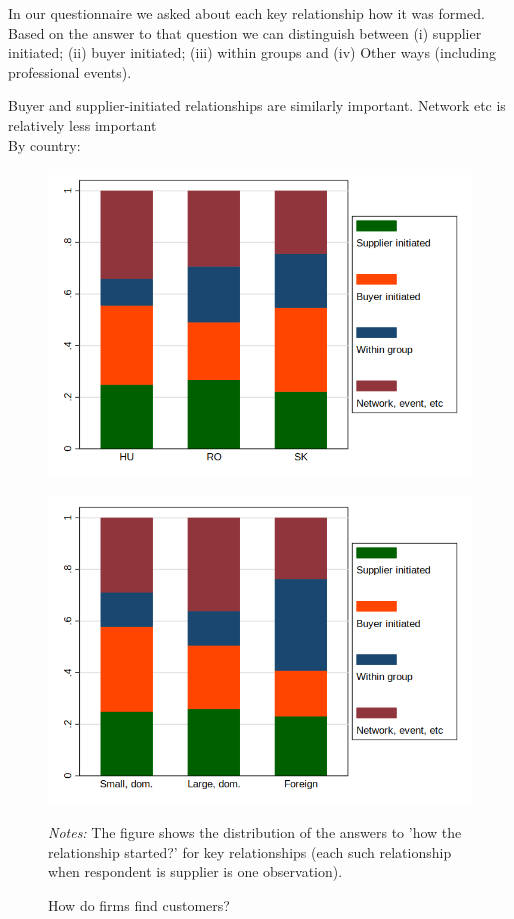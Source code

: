 \documentclass[final, dvipsnames, authoryear,12pt]{elsarticle}
\begin{document}
In our questionnaire we asked about each key relationship how it was formed. Based on the answer to that question we can distinguish between (i) supplier initiated; (ii) buyer initiated; (iii) within groups and (iv) Other ways (including professional events). 



Buyer and supplier-initiated relationships are similarly important. Network etc is relatively less important\\
By country:

\begin{figure}[h]    
    \begin{center}
    \label{fig:rel_form}    
    \caption{How do firms find customers?}  
    \begin{subfloat}[By country]
    {\includegraphics[scale=0.5]{graphs/Table6a.png}}
    \end{subfloat}
    \begin{subfloat}
    {\includegraphics[scale=0.5]{graphs/Table6b.png}}
    \end{subfloat}
    \end{center}
    {\footnotesize \textit{Notes:} The figure shows the distribution of the answers to ’how the relationship started?’ for key relationships (each such relationship when respondent is supplier is one observation).}     
\end{figure}
\end{document}
